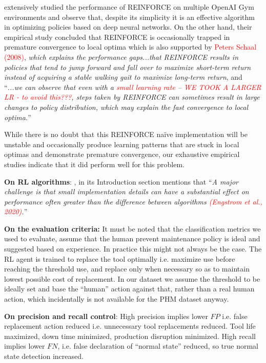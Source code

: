 \documentclass[a4paper, 12pt]{article}
\begin{document}
\cite{duan2016benchmarking} extensively studied the performance of REINFORCE on multiple OpenAI Gym environments and observe that, despite its simplicity it is an effective algorithm in optimizing policies based on deep neural networks. On the other hand, their empirical study concluded that REINFORCE is occasionally trapped in premature convergence to local optima which is also supported by \textcolor{red}{Peters Schaal (2008)}, \textit{which explains the performance gaps...that REINFORCE results in policies that tend to jump forward and fall over to maximize short-term return instead of acquiring a stable walking gait to maximize long-term return}, and ``\textit{...we can observe that even with a \textcolor{red}{small learning rate} -- \textcolor{red}{WE TOOK A LARGER LR - to avoid this???}, steps taken by REINFORCE can sometimes result in large changes to policy distribution, which may explain the fast convergence to local optima.}''

While there is no doubt that this REINFORCE na\"ive implementation will be unstable and occasionally produce learning patterns that are stuck in local optimas and demonstrate premature convergence, our exhaustive empirical studies indicate that it did perform well for this problem. 

\textbf{On RL algorithms}: \cite{SB3-paper}, in its Introduction section mentions that ``\textit{A major challenge is that small implementation details can have a substantial effect on performance often greater than the difference between algorithms \textcolor{red}{(Engstrom et al., 2020)}.}''

\textbf{On the evaluation criteria:} It must be noted that the classification metrics we used to evaluate, assume that the human prevent maintenance policy is ideal and suggested based on experience. In practice this might not always be the case. The RL agent is trained to replace the tool optimally i.e. maximize use before reaching the threshold use, and replace only when necessary so as to maintain lowest possible cost of replacement. In our dataset we assume the threshold to be ideally set and base the ``human'' action against that, rather than a real human action, which incidentally is not available for the PHM dataset anyway.

\textbf{On precision and recall control}: High precision implies lower $FP$ i.e. false replacement action reduced i.e. unnecessary tool replacements reduced. Tool life maximized, down time minimized, production disruption minimized.  High recall implies lower $FN$, i.e. false declaration of ``normal  state'' reduced, so true normal state detection increased.
\end{document}
